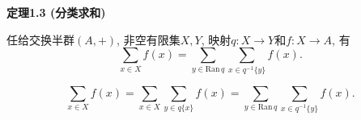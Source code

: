 \documentclass[UTF8]{ctexart}
\begin{document}
\vspace{13pt}

\hypertarget{sec:定理1.3}{}
\noindent\textbf{定理1.3 (分类求和)}

任给交换半群$(A,+)$, 非空有限集$X,Y$, 映射$q:X\to Y$和$f:X\to A$, 有
\vspace{3pt}
\[
    \sum_{x\in X}f(x)=\sum_{y\in\mathrm{Ran}\,q}\sum_{x\in q^{-1}\{y\}}f(x).
\]


\vspace{-9pt}
\begin{equation*}
    \sum_{x\in X}f(x)=\sum_{x\in X}\sum_{y\in q\{x\}}f(x)=
    \sum_{y\in\mathrm{Ran}\,q}\sum_{x\in q^{-1}\{y\}}f(x).
\tag*{\qedsymbol}\end{equation*}
\end{document}

